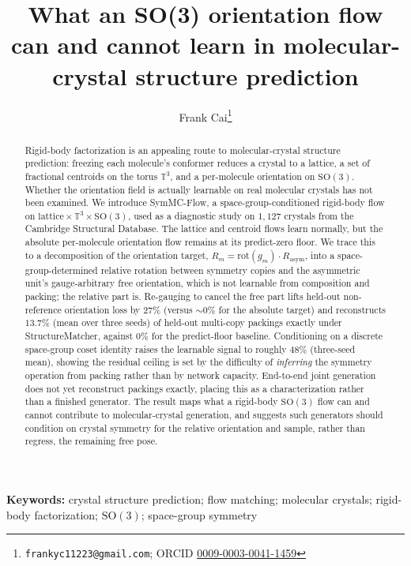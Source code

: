 \documentclass[11pt]{article}
\title{\bfseries What an SO(3) orientation flow can and cannot learn in
molecular-crystal structure prediction}
\author[1]{Frank Cai\thanks{\texttt{frankyc11223@gmail.com};
ORCID \href{https://orcid.org/0009-0003-0041-1459}{0009-0003-0041-1459}}}
\affil[1]{Purdue University, West Lafayette, IN, USA}
\date{}
\begin{document}
\maketitle

\begin{abstract}
\noindent
Rigid-body factorization is an appealing route to molecular-crystal structure
prediction: freezing each molecule's conformer reduces a crystal to a lattice,
a set of fractional centroids on the torus $\mathbb{T}^3$, and a per-molecule
orientation on $\mathrm{SO}(3)$. Whether the orientation field is actually
learnable on real molecular crystals has not been examined. We introduce
SymMC-Flow, a space-group-conditioned rigid-body flow on
$\text{lattice}\times\mathbb{T}^3\times\mathrm{SO}(3)$, used as a diagnostic
study on $1{,}127$ crystals from the Cambridge Structural Database. The
lattice and centroid flows learn normally, but the absolute per-molecule
orientation flow remains at its predict-zero floor. We trace this to a
decomposition of the orientation target,
$R_m = \mathrm{rot}(g_m)\cdot R_{\text{asym}}$, into a space-group-determined
relative rotation between symmetry copies and the asymmetric unit's
gauge-arbitrary free orientation, which is not learnable from composition and
packing; the relative part is. Re-gauging to cancel the free part lifts
held-out non-reference orientation loss by $27\%$ (versus $\sim\!0\%$ for the
absolute target) and reconstructs $13.7\%$ (mean over three seeds) of
held-out multi-copy packings exactly under StructureMatcher, against $0\%$
for the predict-floor baseline. Conditioning on a discrete space-group coset
identity raises the learnable signal to roughly $48\%$ (three-seed mean),
showing the residual ceiling is set by the difficulty of \emph{inferring}
the symmetry operation from packing rather than by network capacity.
End-to-end joint generation does not yet reconstruct packings exactly,
placing this as a characterization rather than a finished generator. The
result maps what a rigid-body $\mathrm{SO}(3)$ flow can and cannot
contribute to molecular-crystal generation, and suggests such generators
should condition on crystal symmetry for the relative orientation and
sample, rather than regress, the remaining free pose.
\end{abstract}

\noindent\textbf{Keywords:} crystal structure prediction; flow matching;
molecular crystals; rigid-body factorization; $\mathrm{SO}(3)$; space-group
symmetry

\end{document}
